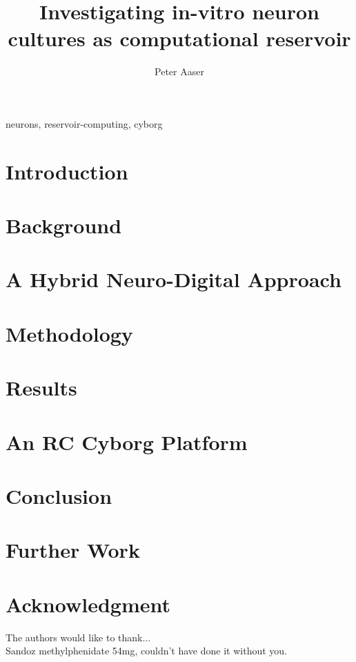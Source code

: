 \documentclass[journal]{IEEEtran}
\begin{document}
\title{Investigating in-vitro neuron cultures as computational reservoir}

\author{Peter Aaser}
%
\maketitle

\begin{abstract}
  \blindtext[2]

\end{abstract}

\begin{IEEEkeywords}
neurons, reservoir-computing, cyborg
\end{IEEEkeywords}

\section{Introduction}

\section{Background}

\section{A Hybrid Neuro-Digital Approach}

\section{Methodology}

\section{Results}

% 
\section{An RC Cyborg Platform}

\section{Conclusion}

\section{Further Work}



\section*{Acknowledgment}
The authors would like to thank...\\
Sandoz methylphenidate 54mg, couldn't have done it without you.


 

\end{document}
